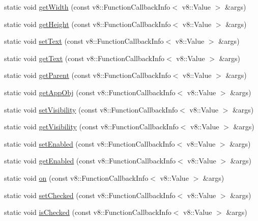 \begin{DoxyCompactItemize}
static void \mbox{\hyperlink{class_rad_j_a_v_1_1_g_u_i_1_1_checkbox_a7af45c983798360631dbf8b26f6365a0}{get\+Width}} (const v8\+::\+Function\+Callback\+Info$<$ v8\+::\+Value $>$ \&args)
\item 
static void \mbox{\hyperlink{class_rad_j_a_v_1_1_g_u_i_1_1_checkbox_aba52b8d206dd8fa5b2405f8fc738db01}{get\+Height}} (const v8\+::\+Function\+Callback\+Info$<$ v8\+::\+Value $>$ \&args)
\item 
static void \mbox{\hyperlink{class_rad_j_a_v_1_1_g_u_i_1_1_checkbox_a5d566159f0012ee3b1e6186ead74fd41}{set\+Text}} (const v8\+::\+Function\+Callback\+Info$<$ v8\+::\+Value $>$ \&args)
\item 
static void \mbox{\hyperlink{class_rad_j_a_v_1_1_g_u_i_1_1_checkbox_a9da295a29d918ec6f84799fc845a09bf}{get\+Text}} (const v8\+::\+Function\+Callback\+Info$<$ v8\+::\+Value $>$ \&args)
\item 
static void \mbox{\hyperlink{class_rad_j_a_v_1_1_g_u_i_1_1_checkbox_a054d626998e4097395c815d36638194e}{get\+Parent}} (const v8\+::\+Function\+Callback\+Info$<$ v8\+::\+Value $>$ \&args)
\item 
static void \mbox{\hyperlink{class_rad_j_a_v_1_1_g_u_i_1_1_checkbox_a37e2ef7cc34d6ebde5575e19eed2f936}{get\+App\+Obj}} (const v8\+::\+Function\+Callback\+Info$<$ v8\+::\+Value $>$ \&args)
\item 
static void \mbox{\hyperlink{class_rad_j_a_v_1_1_g_u_i_1_1_checkbox_a7bf5661d2a5a826e9f1ccadf28d2af83}{set\+Visibility}} (const v8\+::\+Function\+Callback\+Info$<$ v8\+::\+Value $>$ \&args)
\item 
static void \mbox{\hyperlink{class_rad_j_a_v_1_1_g_u_i_1_1_checkbox_aed50ab74c2d98a74d1ba78c76607779a}{get\+Visibility}} (const v8\+::\+Function\+Callback\+Info$<$ v8\+::\+Value $>$ \&args)
\item 
static void \mbox{\hyperlink{class_rad_j_a_v_1_1_g_u_i_1_1_checkbox_a77c0a0b0b0d3864eb937dfdf6e19a579}{set\+Enabled}} (const v8\+::\+Function\+Callback\+Info$<$ v8\+::\+Value $>$ \&args)
\item 
static void \mbox{\hyperlink{class_rad_j_a_v_1_1_g_u_i_1_1_checkbox_a5dc6692db847ae14d49a7338acfaa6db}{get\+Enabled}} (const v8\+::\+Function\+Callback\+Info$<$ v8\+::\+Value $>$ \&args)
\item 
static void \mbox{\hyperlink{class_rad_j_a_v_1_1_g_u_i_1_1_checkbox_af58d6971e68acea1bfb078992e1fc0d8}{on}} (const v8\+::\+Function\+Callback\+Info$<$ v8\+::\+Value $>$ \&args)
\item 
static void \mbox{\hyperlink{class_rad_j_a_v_1_1_g_u_i_1_1_checkbox_a005d3324feeb57c8c1fb8149a87ff317}{set\+Checked}} (const v8\+::\+Function\+Callback\+Info$<$ v8\+::\+Value $>$ \&args)
\item 
static void \mbox{\hyperlink{class_rad_j_a_v_1_1_g_u_i_1_1_checkbox_aa63aa2409e882ddc9ad9ef117173d63a}{is\+Checked}} (const v8\+::\+Function\+Callback\+Info$<$ v8\+::\+Value $>$ \&args)
\end{DoxyCompactItemize}


